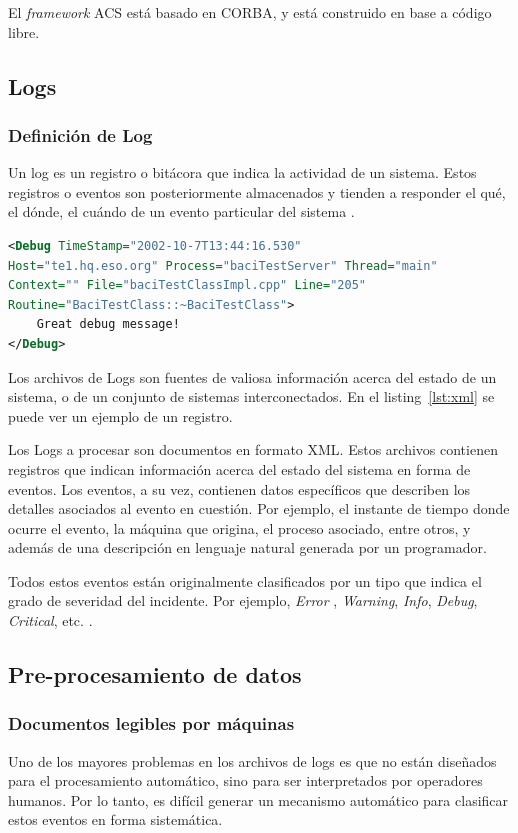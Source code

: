 El \textit{framework} ACS está basado en CORBA\citep{Chiozzi2002}, y está construido en base a código libre.

\subsection{Logs}
\subsubsection{Definición de Log}
Un log es un registro o bitácora que indica la actividad de un sistema. Estos registros o eventos son posteriormente almacenados y tienden a responder el qué, el dónde, el cuándo de un evento particular del sistema \citep{ESOLOG}.


\begin{lstlisting}[label={lst:xml}, caption=Ejemplo un evento XML de log, language=XML]
<Debug TimeStamp="2002-10-7T13:44:16.530"
Host="te1.hq.eso.org" Process="baciTestServer" Thread="main"
Context="" File="baciTestClassImpl.cpp" Line="205"
Routine="BaciTestClass::~BaciTestClass">
    Great debug message!
</Debug>
\end{lstlisting}

Los archivos de Logs son fuentes de valiosa información acerca del estado de un sistema, o de un conjunto de sistemas interconectados. En el listing~\ref{lst:xml} se puede ver un ejemplo de un registro.

Los Logs a procesar son documentos en formato XML. Estos archivos contienen registros que indican información acerca del estado del sistema en forma de eventos. Los eventos, a su vez, contienen datos específicos que describen los detalles asociados al evento en cuestión. Por ejemplo, el instante de tiempo donde ocurre el evento, la máquina que origina, el proceso asociado, entre otros, y además de una descripción en lenguaje natural generada por un programador. 

Todos estos eventos están originalmente clasificados por un tipo que indica el grado de severidad del incidente. Por ejemplo, \textit{Error} , \textit{Warning}, \textit{Info}, \textit{Debug}, \textit{Critical}, etc. \citep{ESOLOG}.


\subsection{Pre-procesamiento de datos}

\subsubsection{Documentos legibles por máquinas}
Uno de los mayores problemas en los archivos de logs es que no están diseñados para el procesamiento automático, sino para ser interpretados por operadores humanos. Por lo tanto, es difícil generar un mecanismo automático para clasificar estos eventos en forma sistemática.


